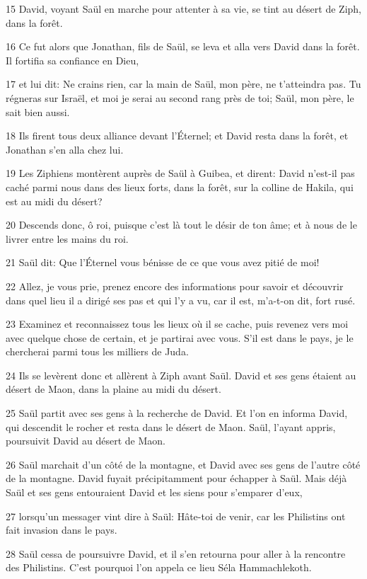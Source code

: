 \par 15 David, voyant Saül en marche pour attenter à sa vie, se tint au désert de Ziph, dans la forêt.
\par 16 Ce fut alors que Jonathan, fils de Saül, se leva et alla vers David dans la forêt. Il fortifia sa confiance en Dieu,
\par 17 et lui dit: Ne crains rien, car la main de Saül, mon père, ne t'atteindra pas. Tu régneras sur Israël, et moi je serai au second rang près de toi; Saül, mon père, le sait bien aussi.
\par 18 Ils firent tous deux alliance devant l'Éternel; et David resta dans la forêt, et Jonathan s'en alla chez lui.
\par 19 Les Ziphiens montèrent auprès de Saül à Guibea, et dirent: David n'est-il pas caché parmi nous dans des lieux forts, dans la forêt, sur la colline de Hakila, qui est au midi du désert?
\par 20 Descends donc, ô roi, puisque c'est là tout le désir de ton âme; et à nous de le livrer entre les mains du roi.
\par 21 Saül dit: Que l'Éternel vous bénisse de ce que vous avez pitié de moi!
\par 22 Allez, je vous prie, prenez encore des informations pour savoir et découvrir dans quel lieu il a dirigé ses pas et qui l'y a vu, car il est, m'a-t-on dit, fort rusé.
\par 23 Examinez et reconnaissez tous les lieux où il se cache, puis revenez vers moi avec quelque chose de certain, et je partirai avec vous. S'il est dans le pays, je le chercherai parmi tous les milliers de Juda.
\par 24 Ils se levèrent donc et allèrent à Ziph avant Saül. David et ses gens étaient au désert de Maon, dans la plaine au midi du désert.
\par 25 Saül partit avec ses gens à la recherche de David. Et l'on en informa David, qui descendit le rocher et resta dans le désert de Maon. Saül, l'ayant appris, poursuivit David au désert de Maon.
\par 26 Saül marchait d'un côté de la montagne, et David avec ses gens de l'autre côté de la montagne. David fuyait précipitamment pour échapper à Saül. Mais déjà Saül et ses gens entouraient David et les siens pour s'emparer d'eux,
\par 27 lorsqu'un messager vint dire à Saül: Hâte-toi de venir, car les Philistins ont fait invasion dans le pays.
\par 28 Saül cessa de poursuivre David, et il s'en retourna pour aller à la rencontre des Philistins. C'est pourquoi l'on appela ce lieu Séla Hammachlekoth.

